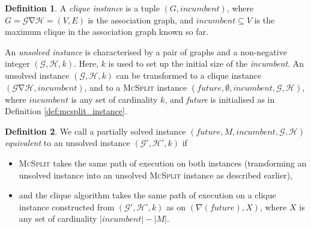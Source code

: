 \documentclass{l4proj}
\theoremstyle{definition}
\newtheorem{definition}{Definition}[chapter]
\theoremstyle{remark}
\DeclareMathOperator{\nablaop}{\nabla}
\begin{document}
\begin{definition}
  A \emph{clique instance} is a tuple $(G, \textit{incumbent})$, where $G =
  \mathcal{G} \nablaop \mathcal{H} = (V, E)$ is the association graph, and
  $\textit{incumbent} \subseteq V$ is the maximum clique in the association
  graph known so far.
\end{definition}

\noindent An \emph{unsolved instance} is characterised by a pair of graphs and a
non-negative integer $(\mathcal{G}, \mathcal{H}, k)$. Here, $k$ is used to set
up the initial size of the \textit{incumbent}. An unsolved instance
$(\mathcal{G}, \mathcal{H}, k)$ can be transformed to a clique instance
$(\mathcal{G} \nablaop \mathcal{H}, \textit{incumbent})$, and to a
\textsc{McSplit} instance $(\textit{future}, \emptyset, \textit{incumbent},
\mathcal{G}, \mathcal{H})$, where $\textit{incumbent}$ is any set of cardinality
$k$, and \textit{future} is initialised as in Definition
\ref{def:mcsplit_instance}.

\begin{definition}
  We call a partially solved instance $(\textit{future}, M, \textit{incumbent},
  \mathcal{G}, \mathcal{H})$ \emph{equivalent} to an unsolved instance
  $(\mathcal{G'}, \mathcal{H'}, k)$ if
  \begin{itemize}
  \item \textsc{McSplit} takes the same path of execution on both instances
    (transforming an unsolved instance into an unsolved \textsc{McSplit}
    instance as described earlier),
  \item and the clique algorithm takes the same path of execution on a clique
    instance constructed from $(\mathcal{G'}, \mathcal{H'}, k)$ as on
    $(\nabla(\textit{future}), X)$, where $X$ is any set of cardinality
    $|\textit{incumbent}| - |M|$.
  \end{itemize}
\end{definition}
\end{document}
